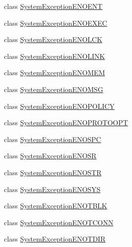 \begin{DoxyCompactItemize}
\item 
class \hyperlink{class_communication_1_1_exception_1_1_system_exception_e_n_o_e_n_t}{System\+Exception\+E\+N\+O\+E\+N\+T}
\item 
class \hyperlink{class_communication_1_1_exception_1_1_system_exception_e_n_o_e_x_e_c}{System\+Exception\+E\+N\+O\+E\+X\+E\+C}
\item 
class \hyperlink{class_communication_1_1_exception_1_1_system_exception_e_n_o_l_c_k}{System\+Exception\+E\+N\+O\+L\+C\+K}
\item 
class \hyperlink{class_communication_1_1_exception_1_1_system_exception_e_n_o_l_i_n_k}{System\+Exception\+E\+N\+O\+L\+I\+N\+K}
\item 
class \hyperlink{class_communication_1_1_exception_1_1_system_exception_e_n_o_m_e_m}{System\+Exception\+E\+N\+O\+M\+E\+M}
\item 
class \hyperlink{class_communication_1_1_exception_1_1_system_exception_e_n_o_m_s_g}{System\+Exception\+E\+N\+O\+M\+S\+G}
\item 
class \hyperlink{class_communication_1_1_exception_1_1_system_exception_e_n_o_p_o_l_i_c_y}{System\+Exception\+E\+N\+O\+P\+O\+L\+I\+C\+Y}
\item 
class \hyperlink{class_communication_1_1_exception_1_1_system_exception_e_n_o_p_r_o_t_o_o_p_t}{System\+Exception\+E\+N\+O\+P\+R\+O\+T\+O\+O\+P\+T}
\item 
class \hyperlink{class_communication_1_1_exception_1_1_system_exception_e_n_o_s_p_c}{System\+Exception\+E\+N\+O\+S\+P\+C}
\item 
class \hyperlink{class_communication_1_1_exception_1_1_system_exception_e_n_o_s_r}{System\+Exception\+E\+N\+O\+S\+R}
\item 
class \hyperlink{class_communication_1_1_exception_1_1_system_exception_e_n_o_s_t_r}{System\+Exception\+E\+N\+O\+S\+T\+R}
\item 
class \hyperlink{class_communication_1_1_exception_1_1_system_exception_e_n_o_s_y_s}{System\+Exception\+E\+N\+O\+S\+Y\+S}
\item 
class \hyperlink{class_communication_1_1_exception_1_1_system_exception_e_n_o_t_b_l_k}{System\+Exception\+E\+N\+O\+T\+B\+L\+K}
\item 
class \hyperlink{class_communication_1_1_exception_1_1_system_exception_e_n_o_t_c_o_n_n}{System\+Exception\+E\+N\+O\+T\+C\+O\+N\+N}
\item 
class \hyperlink{class_communication_1_1_exception_1_1_system_exception_e_n_o_t_d_i_r}{System\+Exception\+E\+N\+O\+T\+D\+I\+R}

\end{DoxyCompactItemize}
